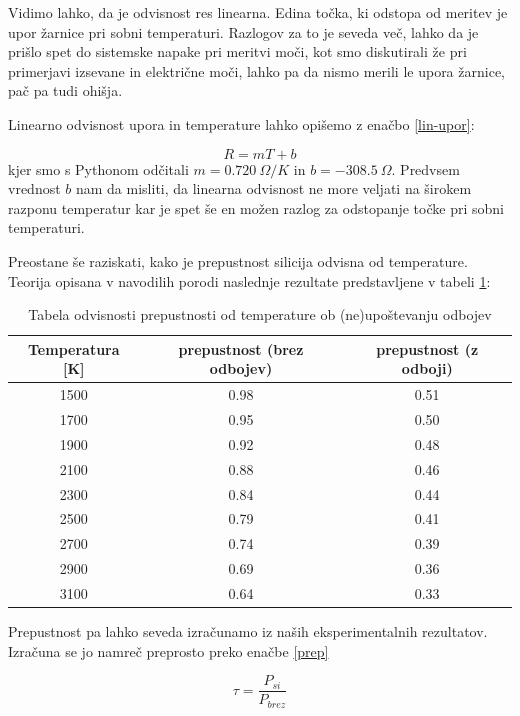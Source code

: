 \documentclass[10pt]{article}
\begin{document}
\noindent Vidimo lahko, da je odvisnost res linearna. Edina točka, ki odstopa od meritev je upor žarnice pri sobni temperaturi. Razlogov za to je seveda več, lahko da je prišlo spet do sistemske napake pri meritvi moči, kot smo diskutirali že pri primerjavi izsevane in električne moči, lahko pa da nismo merili le upora žarnice, pač pa tudi ohišja.

Linearno odvisnost upora in temperature lahko opišemo z enačbo \ref{lin-upor}:

\begin{equation}
    R = m T + b
    \label{lin-upor}
\end{equation}
kjer smo s Pythonom odčitali $m = 0.720\ \Omega /K$ in $b = -308.5\ \Omega$. Predvsem vrednost $b$ nam da misliti, da linearna odvisnost ne more veljati na širokem razponu temperatur kar je spet še en možen razlog za odstopanje točke pri sobni temperaturi.

\newpage

\noindent Preostane še raziskati, kako je prepustnost silicija odvisna od temperature. Teorija opisana v navodilih porodi naslednje rezultate predstavljene v tabeli \ref{prepustnost-teo}:

\begin{table}[!ht]
    \centering
    \begin{tabular}{c|c|c}
        Temperatura [K] & prepustnost (brez odbojev) & prepustnost (z odboji) \\ \hline
        1500 & 0.98 & 0.51 \\ 
        1700 & 0.95 & 0.50 \\ 
        1900 & 0.92 & 0.48 \\ 
        2100 & 0.88 & 0.46 \\ 
        2300 & 0.84 & 0.44 \\ 
        2500 & 0.79 & 0.41 \\ 
        2700 & 0.74 & 0.39 \\ 
        2900 & 0.69 & 0.36 \\ 
        3100 & 0.64 & 0.33 \\ 
    \end{tabular}
    \caption{Tabela odvisnosti prepustnosti od temperature ob (ne)upoštevanju odbojev}
    \label{prepustnost-teo}
\end{table}

\noindent Prepustnost pa lahko seveda izračunamo iz naših eksperimentalnih rezultatov. Izračuna se jo namreč preprosto preko enačbe \ref{prep}

\begin{equation}
    \tau = \frac{P_{si}}{P_{brez}}
    \label{prep}
\end{equation}
\end{document}
